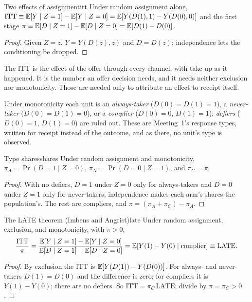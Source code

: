 \documentclass[11pt]{article}
\begin{document}
\begin{prop}{Two effects of assignment}{itt}
Under random assignment alone, $\text{ITT} \equiv \mathbb{E}[Y \mid Z=1] - \mathbb{E}[Y \mid Z=0] = \mathbb{E}[Y(D(1),1) - Y(D(0),0)]$ and
the first stage $\pi \equiv \mathbb{E}[D \mid Z=1] - \mathbb{E}[D \mid Z=0] = \mathbb{E}[D(1) - D(0)]$.
\end{prop}
\begin{proof}
Given $Z = z$, $Y = Y(D(z), z)$ and $D = D(z)$; independence lets the conditioning be dropped.
\end{proof}

The ITT is the effect of the offer through every channel, with take-up as it happened. It is the number an
offer decision needs, and it needs neither exclusion nor monotonicity. Those are needed only to attribute an
effect to receipt itself.

Under monotonicity each unit is an \emph{always-taker} ($D(0) = D(1) = 1$), a \emph{never-taker}
($D(0) = D(1) = 0$), or a \emph{complier} ($D(0) = 0$, $D(1) = 1$); \emph{defiers} ($D(0) = 1$, $D(1) = 0$) are
ruled out. These are Meeting~1's response types, written for receipt instead of the outcome, and as there, no
unit's type is observed.

\begin{prop}{Type shares}{shares}
Under random assignment and monotonicity, $\pi_A = \Pr(D=1 \mid Z=0)$, $\pi_N = \Pr(D=0 \mid Z=1)$, and
$\pi_C = \pi$.
\end{prop}
\begin{proof}
With no defiers, $D = 1$ under $Z = 0$ only for always-takers and $D = 0$ under $Z = 1$ only for never-takers;
independence makes each arm's shares the population's. The rest are compliers, and $\pi = (\pi_A + \pi_C) - \pi_A$.
\end{proof}

\begin{prop}{The LATE theorem (Imbens and Angrist)}{late}
Under random assignment, exclusion, and monotonicity, with $\pi > 0$,
\[
  \frac{\text{ITT}}{\pi} = \frac{\mathbb{E}[Y \mid Z=1] - \mathbb{E}[Y \mid Z=0]}{\mathbb{E}[D \mid Z=1] - \mathbb{E}[D \mid Z=0]}
  = \mathbb{E}[Y(1) - Y(0) \mid \text{complier}] \equiv \text{LATE}.
\]
\end{prop}
\begin{proof}
By exclusion the ITT is $\mathbb{E}[Y(D(1)) - Y(D(0))]$. For always- and never-takers $D(1) = D(0)$ and the difference
is zero; for compliers it is $Y(1) - Y(0)$; there are no defiers. So $\text{ITT} = \pi_C\,\text{LATE}$; divide by
$\pi = \pi_C > 0$.
\end{proof}
\end{document}

